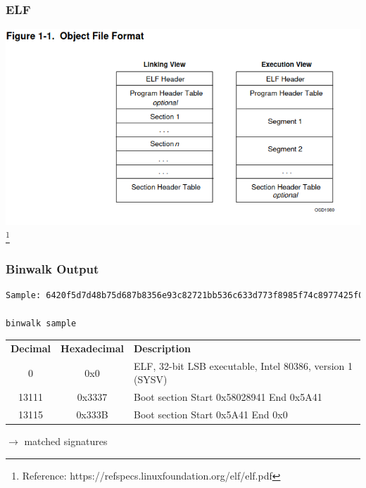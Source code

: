 \begin{frame}
    \frametitle{ELF}
    \centering
    \includegraphics[scale=0.5]{img/elf.png}
    \footnote{Reference: https://refspecs.linuxfoundation.org/elf/elf.pdf}
\end{frame}

\begin{frame}[fragile]
\frametitle{Binwalk Output}

\begin{lstlisting}[language=bash, basicstyle=\ttfamily, breaklines=true]
Sample: 6420f5d7d48b75d687b8356e93c82721bb536c633d773f8985f74c8977425f04

binwalk sample
\end{lstlisting}

\begin{tabular}{ccp{}}
\textbf{Decimal} & \textbf{Hexadecimal} & \textbf{Description}\\
0                & 0x0                  & ELF, 32-bit LSB executable, Intel 80386, version 1 (SYSV) \\
13111            & 0x3337               & Boot section Start 0x58028941 End 0x5A41 \\
13115            & 0x333B               & Boot section Start 0x5A41 End 0x0 \\
\end{tabular}

\vspace{1cm}

$\to$ matched signatures
\end{frame}

